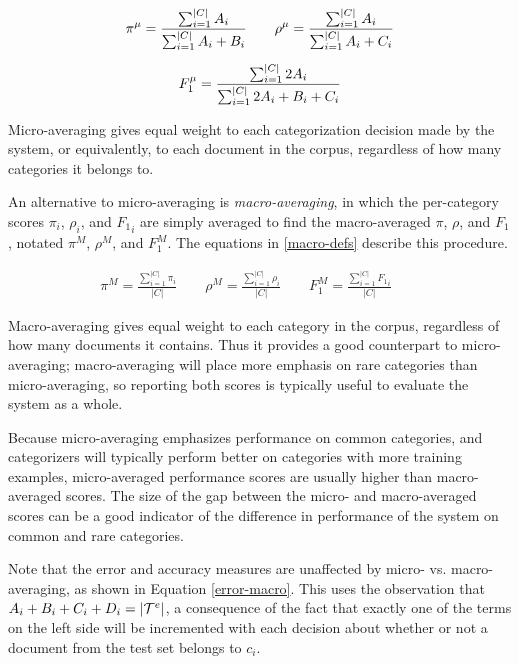 \begin{gather} \label{micro-defs}
 \pi^\mu = \frac{\sum_{i=1}^{|C|}{A_i}} {\sum_{i=1}^{|C|}{A_i+B_i}} \qquad
\rho^\mu = \frac{\sum_{i=1}^{|C|}{A_i}} {\sum_{i=1}^{|C|}{A_i+C_i}} \\[6pt]
 F^\mu_1 = \frac{\sum_{i=1}^{|C|}{2 A_i}} {\sum_{i=1}^{|C|}{2 A_i+B_i+C_i}} \notag
\end{gather}

Micro-averaging gives equal weight to each categorization decision
made by the system, or equivalently, to each document in the corpus,
regardless of how many categories it belongs to.

An alternative to micro-averaging is \emph{macro-averaging}, in which
the per-category scores $\pi_i$, $\rho_i$, and ${F_1}_i$ are simply
averaged to find the macro-averaged $\pi$, $\rho$, and $F_1$, notated
$\pi^M$, $\rho^M$, and $F^M_1$.  The equations in \ref{macro-defs} describe this
procedure.

\begin{gather} \label{macro-defs}
 \pi^M = \frac{\sum_{i=1}^{|C|}{\pi_i}}   {|C|} \qquad
\rho^M = \frac{\sum_{i=1}^{|C|}{\rho_i}}  {|C|} \qquad
 F^M_1 = \frac{\sum_{i=1}^{|C|}{{F_1}_i}} {|C|} \qquad
\end{gather}

Macro-averaging gives equal weight to each category in the corpus,
regardless of how many documents it contains.  Thus it provides a
good counterpart to micro-averaging; macro-averaging will place more
emphasis on rare categories than micro-averaging, so reporting both
scores is typically useful to evaluate the system as a whole.

Because micro-averaging emphasizes performance on common categories,
and categorizers will typically perform better on categories with more
training examples, micro-averaged performance scores are usually
higher than macro-averaged scores.  The size of the gap between the
micro- and macro-averaged scores can be a good indicator of the
difference in performance of the system on common and rare categories.

Note that the error and accuracy measures are unaffected by micro-
vs. macro-averaging, as shown in Equation \ref{error-macro}.  This uses
the observation that $A_i+B_i+C_i+D_i = |\mathcal{T}^e|$, a consequence of the
fact that exactly one of the terms on the left side will be
incremented with each decision about whether or not a document from the test
set belongs to $c_i$.

